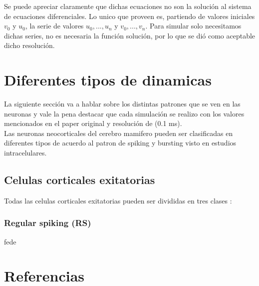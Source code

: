 \documentclass[12pt]{article}
\begin{document}
Se puede apreciar claramente que dichas ecuaciones no son la solución al sistema de ecuaciones diferenciales. Lo unico que proveen es, partiendo de valores iniciales $v_0$ y $u_0$,
la serie de valores $u_0,...,u_n$ y $v_0,...,v_n$. Para simular solo necesitamos dichas series, no es necesaria la función solución, por lo que se dió como aceptable dicho resolución.

\section{Diferentes tipos de dinamicas}

La siguiente sección va a hablar sobre los distintas patrones que se ven en las neuronas y vale la pena destacar que cada simulación se realizo con los valores
mencionados en el paper original y resolución de (0.1 ms). \\

Las neuronas neocorticales del cerebro mamifero pueden ser clasificadas en diferentes tipos de acuerdo al patron de spiking y bursting visto en estudios intracelulares. \\

\subsection{Celulas corticales exitatorias}
Todas las celulas corticales exitatorias pueden ser divididas en tres clases \cite{firingPatters} \cite{chatteringCells}:

\newpage
\subsubsection{Regular spiking (RS)}
fede
\newpage

\section{Referencias}
\end{document}
